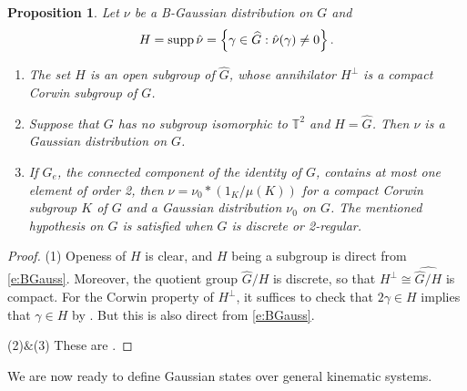 \documentclass[12pt,reqno]{amsart}
\newtheorem{prop}[thm]{Proposition}
\theoremstyle{definition}
\theoremstyle{definition}
\theoremstyle{definition}
\numberwithin{thm}{section}
\numberwithin{equation}{section}
\newcommand{\set}[1]{\left\{#1\right\}}
\newcommand{\tor}{\mathbb{T}}
\newcommand{\wh}[1]{\widehat{#1}}
\begin{document}
\begin{prop}\label{prop-B-Gaussian}
Let $\nu$ be a B-Gaussian distribution on $G$ and
    $$H = {\rm supp}\,\hat{\nu} = \set{\gamma\in \widehat{G}: \hat{\nu}(\gamma)\neq 0}.$$
\begin{enumerate}
    \item The set $H$ is an open subgroup of $\widehat{G}$, whose annihilator $H^{\perp}$ is a compact Corwin subgroup of $G$.
    
    
    \item
    Suppose that $G$ has no subgroup isomorphic to $\tor^2$ and $H=\widehat{G}$. Then $\nu$ is a Gaussian distribution on $G$.    
        
    \item If $G_e$, the connected component of the identity of $G$, contains at most one element of order 2, then $\nu = \nu_0 * (1_K/\mu(K))$ for a compact Corwin subgroup $K$ of $G$ and a Gaussian distribution $\nu_0$ on $G$. The mentioned hypothesis on $G$ is satisfied when $G$ is discrete or 2-regular.
    
\end{enumerate}
\end{prop}
\begin{proof}
(1) Openess of $H$ is clear, and $H$ being a subgroup is direct from \eqref{e:BGauss}. Moreover, the quotient group $\wh{G}/H$ is discrete, so that $H^\perp \cong \widehat{\wh{G}/H}$ is compact. For the Corwin property of $H^\perp$, it suffices to check that $2\gamma \in H$ implies that $\gamma\in H$ by \cite[Lemma 7.2]{Feldman}. But this is also direct from \eqref{e:BGauss}.


\vspace{0.5cm}

(2)$\&$(3) These are \cite[Lemma 9.7, Theorem 9.9]{Feldman}.
\end{proof}

We are now ready to define Gaussian states over general kinematic systems. 
\end{document}
